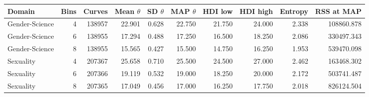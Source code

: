 \begin{tabular}{lrrrrrrrrr}
\toprule
Domain & Bins & Curves & Mean $\theta$ & SD $\theta$ & MAP $\theta$ & HDI low & HDI high & Entropy & RSS at MAP \\
\midrule
Gender-Science & 4 & 138957 & 22.901 & 0.628 & 22.750 & 21.750 & 24.000 & 2.338 & 108860.878 \\
Gender-Science & 6 & 138955 & 17.294 & 0.488 & 17.250 & 16.500 & 18.250 & 2.086 & 330497.343 \\
Gender-Science & 8 & 138955 & 15.565 & 0.427 & 15.500 & 14.750 & 16.250 & 1.953 & 539470.098 \\
Sexuality & 4 & 207367 & 25.658 & 0.710 & 25.500 & 24.500 & 27.000 & 2.462 & 163468.302 \\
Sexuality & 6 & 207366 & 19.119 & 0.532 & 19.000 & 18.250 & 20.000 & 2.172 & 503741.487 \\
Sexuality & 8 & 207365 & 17.049 & 0.456 & 17.000 & 16.250 & 17.750 & 2.018 & 826124.504 \\
\bottomrule
\end{tabular}
